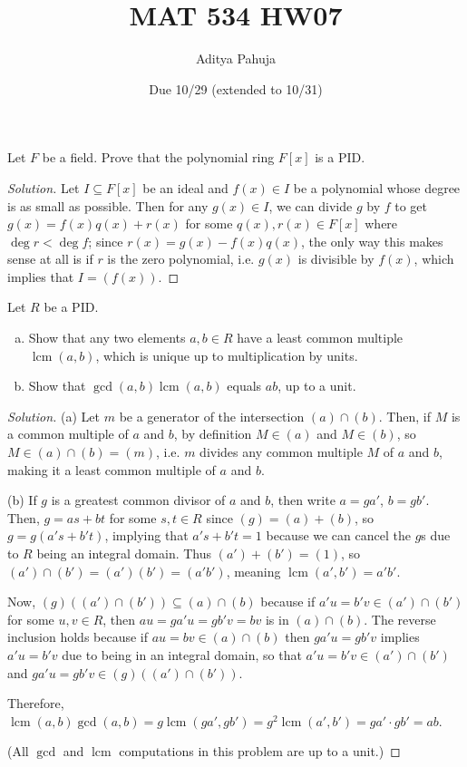 \documentclass[10pt]{article}
\title{MAT 534 HW07}
\author{\large Aditya Pahuja}
\date{\large Due 10/29 (extended to 10/31)}
\providecommand{\ii}{\item}
\newenvironment{soln}{\begin{proof}[Solution]}{\end{proof}}
\providecommand{\lcm}{\operatorname{lcm}}
\begin{document}
\maketitle

\begin{problem}
    Let $F$ be a field. Prove that the polynomial ring $F[x]$ is a PID.
\end{problem}

\begin{soln}
    Let $I\subseteq F[x]$ be an ideal and $f(x)\in I$ be a polynomial
    whose degree is as small as possible. Then for any $g(x)\in I$,
    we can divide $g$ by $f$ to get $g(x) = f(x)q(x) + r(x)$
    for some $q(x),r(x)\in F[x]$ where $\deg r < \deg f$;
    since $r(x) = g(x) - f(x)q(x)$, the only way this makes sense at all
    is if $r$ is the zero polynomial, i.e. $g(x)$ is divisible by $f(x)$,
    which implies that $I = (f(x))$.
\end{soln}

\begin{problem}
    Let $R$ be a PID.
    \begin{enumerate}[(a)]
        \ii Show that any two elements $a,b\in R$ have a least common multiple
	$\lcm(a,b)$, which is unique up to multiplication by units.
	\ii Show that $\gcd(a,b)\lcm(a,b)$ equals $ab$, up to a unit.
    \end{enumerate}
\end{problem}

\begin{soln}
    (a) Let $m$ be a generator of the intersection $(a)\cap(b)$.
    Then, if $M$ is a common multiple of $a$ and $b$,
    by definition $M\in (a)$ and $M\in (b)$, so $M\in(a)\cap (b) = (m)$,
    i.e. $m$ divides any common multiple $M$ of $a$ and $b$,
    making it a least common multiple of $a$ and $b$.

    (b) If $g$ is a greatest common divisor of $a$ and $b$, then
    write $a = ga'$, $b = gb'$. Then,
    $g = as + bt$ for some $s,t\in R$ since $(g) = (a) + (b)$,
    so $g = g(a's + b't)$, implying that $a's + b't = 1$
    because we can cancel the $g$s due to $R$ being an integral domain.
    Thus $(a') + (b') = (1)$, so $(a')\cap(b') = (a')(b') = (a'b')$,
    meaning $\lcm(a',b') = a'b'$.

    Now, $(g)((a')\cap(b')) \subseteq (a)\cap(b)$ because
    if $a'u = b'v\in (a')\cap(b')$ for some $u,v\in R$, then
    $au = ga'u = gb'v = bv$ is in $(a)\cap (b)$.
    The reverse inclusion holds because
    if $au = bv\in (a)\cap(b)$ then $ga'u = gb'v$ implies $a'u = b'v$
    due to being in an integral domain, so that
    $a'u = b'v\in (a')\cap(b')$ and $ga'u = gb'v\in (g)((a')\cap(b'))$.

    Therefore, $\lcm(a,b)\gcd(a,b) = g\lcm(ga',gb') = g^2\lcm(a',b')
    = ga'\cdot gb' = ab$.

    (All $\gcd$ and $\lcm$ computations in this problem are up to a unit.)
\end{soln}
\end{document}
